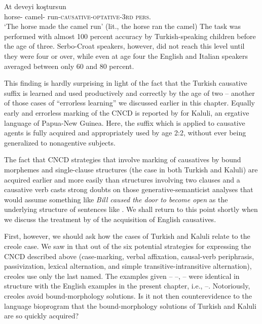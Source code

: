 \ea\label{ex:3:76}
\gll At deveyi koştursun\\
{horse-\NOM} {camel-\ACC} {run-\textsc{causative-optative-3rd pers.}}\\
\glt `The horse made the camel run' (lit., the horse ran the camel)
\z
The task was performed with almost 100 percent accuracy by Turkish-speaking children before the age of three. Serbo-Croat speakers, however, did not reach this level until they were four or over, while even at age four the English and Italian speakers averaged between only 60 and 80 percent.

This finding is hardly surprising in light of the fact that the Turkish causative suffix is learned and used productively and correctly by the age of two -- another of those cases of ``errorless learning'' we discussed earlier in this chapter. Equally early and errorless marking of the CNCD is reported by \citet{Schiefflin1979} for Kaluli, an ergative language of Papua-New Guinea. Here, the suffix which is applied to causative agents is fully acquired and appropriately used by age 2:2, without ever being generalized to nonagentive subjects.

The fact that CNCD strategies that involve marking of causatives by bound morphemes and single-clause structures (the case in both Turkish and Kaluli) are acquired earlier and more easily than struc\-tures involving two clauses and a causative verb casts strong doubts on those generative-semanticist analyses that would assume something like \textit{Bill caused the door to become open} as the underlying structure of sentences like . We shall return to this point shortly when we discuss the treatment by \citet{Bowerman1974} of the acquisition of English causatives.

First, however, we should ask how the cases of Turkish and Kaluli relate to the creole case. We saw in  that out of the six potential strategies for expressing the CNCD described above (case-marking, verbal affixation, causal-verb periphrasis, passivization, lexical
alternation, and simple transitive-intransitive alternation), creoles use only the last named. The examples given -- --,  -- were identical in structure with the English examples in the present chapter, i.e., --. Notoriously, creoles avoid bound-morphology solutions. Is it not then counterevidence to the language bioprogram that the bound-morphology solutions of Turkish and Kaluli are so quickly acquired?

